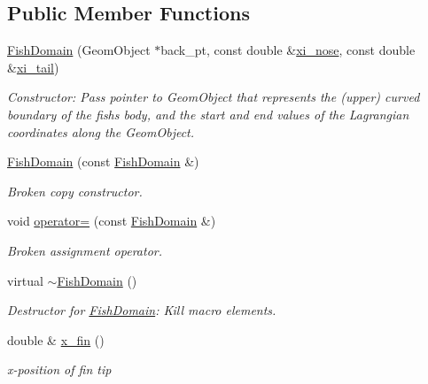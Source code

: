 \subsection*{Public Member Functions}
\begin{DoxyCompactItemize}
\item 
\hyperlink{classoomph_1_1FishDomain_a96f1e192900962ee55d063577822cd12}{Fish\+Domain} (Geom\+Object $\ast$back\+\_\+pt, const double \&\hyperlink{classoomph_1_1FishDomain_a773b98977806c2b27531425ecf5e3f8e}{xi\+\_\+nose}, const double \&\hyperlink{classoomph_1_1FishDomain_ae2bcc0014506ba2225b928f319a27c9d}{xi\+\_\+tail})
\begin{DoxyCompactList}\small\item\em Constructor\+: Pass pointer to Geom\+Object that represents the (upper) curved boundary of the fish\textquotesingle{}s body, and the start and end values of the Lagrangian coordinates along the Geom\+Object. \end{DoxyCompactList}\item 
\hyperlink{classoomph_1_1FishDomain_a9436a46493f270e194b1cff950c6670e}{Fish\+Domain} (const \hyperlink{classoomph_1_1FishDomain}{Fish\+Domain} \&)
\begin{DoxyCompactList}\small\item\em Broken copy constructor. \end{DoxyCompactList}\item 
void \hyperlink{classoomph_1_1FishDomain_a87fdf6ae5c6d51e2dcd1aecb494ddaee}{operator=} (const \hyperlink{classoomph_1_1FishDomain}{Fish\+Domain} \&)
\begin{DoxyCompactList}\small\item\em Broken assignment operator. \end{DoxyCompactList}\item 
virtual \hyperlink{classoomph_1_1FishDomain_ab51c01c611efba9f940409e5154c9cd0}{$\sim$\+Fish\+Domain} ()
\begin{DoxyCompactList}\small\item\em Destructor for \hyperlink{classoomph_1_1FishDomain}{Fish\+Domain}\+: Kill macro elements. \end{DoxyCompactList}\item 
double \& \hyperlink{classoomph_1_1FishDomain_ae5343cbda69a625a56a7949edd43cad4}{x\+\_\+fin} ()
\begin{DoxyCompactList}\small\item\em x-\/position of fin tip \end{DoxyCompactList}\item 

\end{DoxyCompactItemize}
